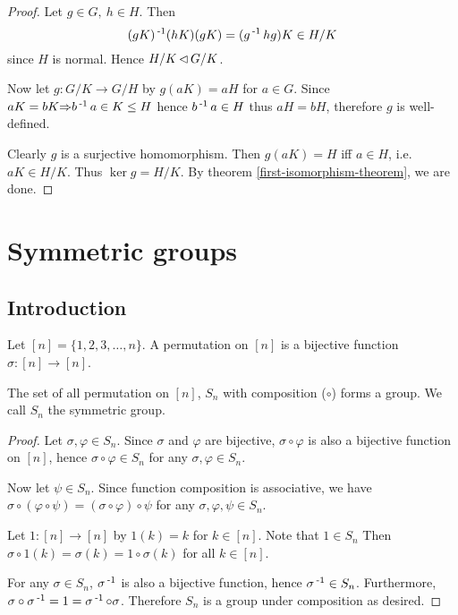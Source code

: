 \documentclass[12pt]{article}
\begin{document}
	\begin{proof}
		Let $g\in G,\ h\in H$. Then
		$$(gK)\operatorname{^{-1}} (hK) (gK) = (g\operatorname{^{-1}} h g)K \in H/K$$
		since $H$ is normal. Hence $H/K \operatorname{\vartriangleleft} G/K$.

		Now let $g: G/K \to G/H$ by $g(aK) = aH$ for $a\in G$. Since $aK=bK {\Rightarrow} b\operatorname{^{-1}} a \in K \leq H$ hence $b\operatorname{^{-1}} a\in H$ thus $aH=bH$, therefore $g$ is well-defined.

		Clearly $g$ is a surjective homomorphism. Then $g(aK) = H$ iff $a\in H$, i.e. $aK \in H/K$. Thus $\ker g = H/K$. By theorem \ref{first-isomorphism-theorem}, we are done.
	\end{proof}

\newpage
\section{Symmetric groups}

\subsection{Introduction}
	\begin{define}
		Let $[n] = \{1,2,3,\dots,n\}$. A permutation on $[n]$ is a bijective function $\sigma: [n] \to [n]$.
	\end{define}

	\begin{theorem}
		The set of all permutation on $[n]$, $S_n$ with composition ($\circ$) forms a group. We call $S_n$ the symmetric group.
	\end{theorem}
	\begin{proof}
		Let $\sigma,\varphi\in S_n$. Since $\sigma$ and $\varphi$ are bijective, $\sigma \circ \varphi$ is also a bijective function on $[n]$, hence $\sigma \circ \varphi \in S_n$ for any $\sigma, \varphi \in S_n$.

		Now let $\psi \in S_n$. Since function composition is associative, we have $\sigma \circ (\varphi \circ \psi) = (\sigma \circ \varphi) \circ \psi$ for any $\sigma, \varphi, \psi \in S_n$.

		Let $1 : [n] \to [n]$ by $1(k) = k$ for $k\in [n]$. Note that $1\in S_n$ Then $\sigma \circ 1 (k) = \sigma(k) = 1\circ \sigma(k)$ for all $k\in [n]$.

		For any $\sigma \in S_n$, $\sigma\operatorname{^{-1}}$ is also a bijective function, hence $\sigma\operatorname{^{-1}} \in S_n$. Furthermore, $\sigma \circ \sigma\operatorname{^{-1}} = 1 = \sigma\operatorname{^{-1}} \circ \sigma$. Therefore $S_n$ is a group under composition as desired.
	\end{proof}
\end{document}

